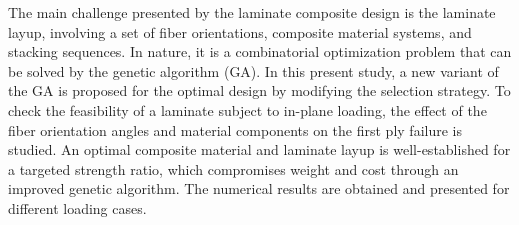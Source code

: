 The main challenge presented by the laminate composite design is the laminate
layup, involving a set of fiber orientations, composite material systems, and
stacking sequences. In nature, it is a combinatorial optimization problem that
can be solved by the genetic algorithm (GA). In this present study, a new
variant of the GA is proposed for the optimal design by modifying the selection
strategy.  To check the feasibility of a laminate subject to in-plane loading,
the effect of the fiber orientation angles and material components on the first
ply failure is studied.  An optimal composite material and laminate layup is
well-established for a targeted strength ratio, which compromises weight and
cost through an improved genetic algorithm. The numerical results are obtained
and presented for different loading cases.
